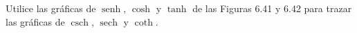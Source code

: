 \item Utilice las gráficas de $\operatorname{senh}$, $\cosh$ y $\tanh$ de las Figuras 6.41 y 6.42 para trazar las gráficas de $\operatorname{csch}$, $\operatorname{sech}$ y $\coth$.
